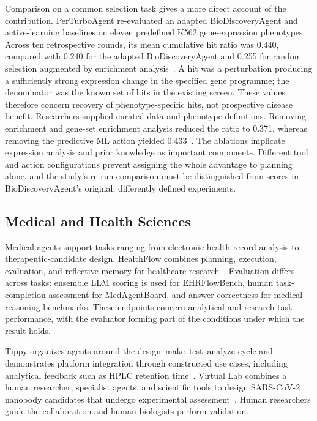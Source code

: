 Comparison on a common selection task gives a more direct account of the contribution. PerTurboAgent re-evaluated an adapted BioDiscoveryAgent and active-learning baselines on eleven predefined K562 gene-expression phenotypes. Across ten retrospective rounds, its mean cumulative hit ratio was 0.440, compared with 0.240 for the adapted BioDiscoveryAgent and 0.255 for random selection augmented by enrichment analysis~\cite{asd0034}. A hit was a perturbation producing a sufficiently strong expression change in the specified gene programme; the denominator was the known set of hits in the existing screen. These values therefore concern recovery of phenotype-specific hits, not prospective disease benefit. Researchers supplied curated data and phenotype definitions. Removing enrichment and gene-set enrichment analysis reduced the ratio to 0.371, whereas removing the predictive ML action yielded 0.433~\cite{asd0034}. The ablations implicate expression analysis and prior knowledge as important components. Different tool and action configurations prevent assigning the whole advantage to planning alone, and the study's re-run comparison must be distinguished from scores in BioDiscoveryAgent's original, differently defined experiments.

\subsection{Medical and Health Sciences}

Medical agents support tasks ranging from electronic-health-record analysis to therapeutic-candidate design. HealthFlow combines planning, execution, evaluation, and reflective memory for healthcare research~\cite{asd0002}. Evaluation differs across tasks: ensemble LLM scoring is used for EHRFlowBench, human task-completion assessment for MedAgentBoard, and answer correctness for medical-reasoning benchmarks. These endpoints concern analytical and research-task performance, with the evaluator forming part of the conditions under which the result holds.

Tippy organizes agents around the design--make--test--analyze cycle and demonstrates platform integration through constructed use cases, including analytical feedback such as HPLC retention time~\cite{asd0008}. Virtual Lab combines a human researcher, specialist agents, and scientific tools to design SARS-CoV-2 nanobody candidates that undergo experimental assessment~\cite{asd0054}. Human researchers guide the collaboration and human biologists perform validation.

